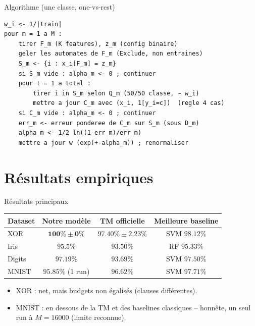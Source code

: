 \documentclass[10pt,aspectratio=169]{beamer}
\begin{document}
\begin{frame}[fragile]{Algorithme (une classe, one-vs-rest)}
\footnotesize
\begin{verbatim}
w_i <- 1/|train|
pour m = 1 a M :
    tirer F_m (K features), z_m (config binaire)
    geler les automates de F_m (Exclude, non entraines)
    S_m <- {i : x_i[F_m] = z_m}
    si S_m vide : alpha_m <- 0 ; continuer
    pour t = 1 a total :
        tirer i in S_m selon Q_m (50/50 classe, ~ w_i)
        mettre a jour C_m avec (x_i, 1[y_i=c])  (regle 4 cas)
    si C_m vide : alpha_m <- 0 ; continuer
    err_m <- erreur ponderee de C_m sur S_m (sous D_m)
    alpha_m <- 1/2 ln((1-err_m)/err_m)
    mettre a jour w (exp(+-alpha_m)) ; renormaliser
\end{verbatim}
\end{frame}

\section{Résultats empiriques}

\begin{frame}{Résultats principaux}
\begin{center}
\small
\begin{tabular}{lccc}
\toprule
Dataset & Notre modèle & TM officielle & Meilleure baseline \\
\midrule
XOR    & $\mathbf{100\%\pm0\%}$ & $97.40\%\pm2.23\%$ & SVM $98.12\%$ \\
Iris   & $95.5\%$ & $93.50\%$ & RF $95.33\%$ \\
Digits & $97.19\%$ & $93.69\%$ & SVM $97.50\%$ \\
MNIST  & $95.85\%$ (1 run) & $96.62\%$ & SVM $97.71\%$ \\
\bottomrule
\end{tabular}
\end{center}
\vspace{3mm}
\begin{itemize}
  \item XOR : net, mais budgets non égalisés (clauses différentes).
  \item MNIST : en dessous de la TM et des baselines classiques -- honnête,
  un seul run à $M{=}16000$ (limite reconnue).
\end{itemize}
\end{frame}
\end{document}
